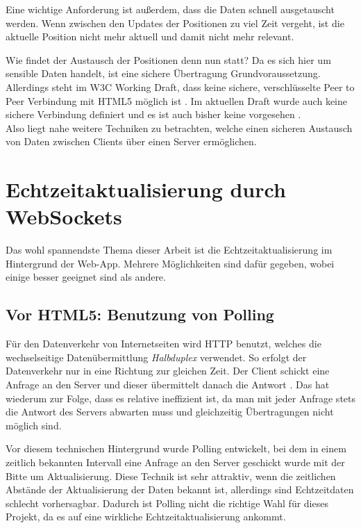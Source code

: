 Eine wichtige Anforderung ist außerdem, dass die Daten schnell ausgetauscht werden. Wenn zwischen den Updates der Positionen zu viel Zeit vergeht, ist die aktuelle Position nicht mehr aktuell und damit nicht mehr relevant.\par

Wie findet der Austausch der Positionen denn nun statt? Da es sich hier um sensible Daten handelt, ist eine sichere Übertragung Grundvoraussetzung. Allerdings steht im W3C Working Draft, dass keine sichere, verschlüsselte Peer to Peer Verbindung mit HTML5 möglich ist \cite{w3cworkingdraft}. Im aktuellen Draft wurde auch keine sichere Verbindung definiert und es ist auch bisher keine vorgesehen \cite{w3ccurrent}.\\
Also liegt nahe weitere Techniken zu betrachten, welche einen sicheren Austausch von Daten zwischen Clients über einen Server ermöglichen.

\section{Echtzeitaktualisierung durch WebSockets}
Das wohl spannendste Thema dieser Arbeit ist die Echtzeitaktualisierung im Hintergrund der Web-App. Mehrere Möglichkeiten sind dafür gegeben, wobei einige besser geeignet sind als andere.

\subsection{Vor HTML5: Benutzung von Polling}
Für den Datenverkehr von Internetseiten wird HTTP benutzt, welches die wechselseitige Datenübermittlung \emph{Halbduplex} verwendet. So erfolgt der Datenverkehr nur in eine Richtung zur gleichen Zeit. Der Client schickt eine Anfrage an den Server und dieser übermittelt danach die Antwort \cite[S. xx]{ws}. Das hat wiederum zur Folge, dass es relative ineffizient ist, da man mit jeder Anfrage stets die Antwort des Servers abwarten muss und gleichzeitig Übertragungen nicht möglich sind.\par

Vor diesem technischen Hintergrund wurde Polling entwickelt, bei dem in einem zeitlich bekannten Intervall eine Anfrage an den Server geschickt wurde mit der Bitte um Aktualisierung. Diese Technik ist sehr attraktiv, wenn die zeitlichen Abstände der Aktualisierung der Daten bekannt ist, allerdings sind Echtzeitdaten schlecht vorhersagbar. Dadurch ist Polling nicht die richtige Wahl für dieses Projekt, da es auf eine wirkliche Echtzeitaktualisierung ankommt.\par

